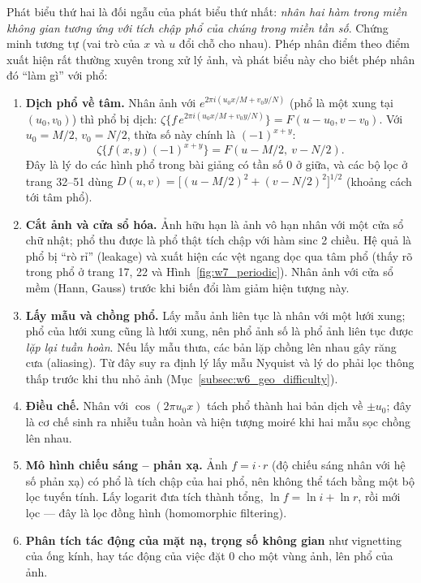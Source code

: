 Phát biểu thứ hai là đối ngẫu của phát biểu thứ nhất: \emph{nhân hai hàm trong miền không gian tương ứng với tích chập phổ của chúng trong miền tần số}. Chứng minh tương tự (vai trò của $x$ và $u$ đổi chỗ cho nhau). Phép nhân điểm theo điểm xuất hiện rất thường xuyên trong xử lý ảnh, và phát biểu này cho biết phép nhân đó ``làm gì'' với phổ:

\begin{enumerate}
    \item \textbf{Dịch phổ về tâm.} Nhân ảnh với $e^{2\pi i(u_0 x/M + v_0 y/N)}$ (phổ là một xung tại $(u_0, v_0)$) thì phổ bị dịch: $\zeta\{f\,e^{2\pi i(u_0 x/M + v_0 y/N)}\} = F(u - u_0, v - v_0)$. Với $u_0 = M/2$, $v_0 = N/2$, thừa số này chính là $(-1)^{x + y}$:
    \begin{equation}
    \zeta\{f(x, y)(-1)^{x + y}\} = F(u - M/2,\ v - N/2).
    \end{equation}
    Đây là lý do các hình phổ trong bài giảng có tần số $0$ ở giữa, và các bộ lọc ở trang 32--51 dùng $D(u, v) = \big[(u - M/2)^2 + (v - N/2)^2\big]^{1/2}$ (khoảng cách tới tâm phổ).
    \item \textbf{Cắt ảnh và cửa sổ hóa.} Ảnh hữu hạn là ảnh vô hạn nhân với một cửa sổ chữ nhật; phổ thu được là phổ thật tích chập với hàm sinc 2 chiều. Hệ quả là phổ bị ``rò rỉ'' (leakage) và xuất hiện các vệt ngang dọc qua tâm phổ (thấy rõ trong phổ ở trang 17, 22 và Hình~\ref{fig:w7_periodic}). Nhân ảnh với cửa sổ mềm (Hann, Gauss) trước khi biến đổi làm giảm hiện tượng này.
    \item \textbf{Lấy mẫu và chồng phổ.} Lấy mẫu ảnh liên tục là nhân với một lưới xung; phổ của lưới xung cũng là lưới xung, nên phổ ảnh số là phổ ảnh liên tục được \emph{lặp lại tuần hoàn}. Nếu lấy mẫu thưa, các bản lặp chồng lên nhau gây răng cưa (aliasing). Từ đây suy ra định lý lấy mẫu Nyquist và lý do phải lọc thông thấp trước khi thu nhỏ ảnh (Mục~\ref{subsec:w6_geo_difficulty}).
    \item \textbf{Điều chế.} Nhân với $\cos(2\pi u_0 x)$ tách phổ thành hai bản dịch về $\pm u_0$; đây là cơ chế sinh ra nhiễu tuần hoàn và hiện tượng moiré khi hai mẫu sọc chồng lên nhau.
    \item \textbf{Mô hình chiếu sáng -- phản xạ.} Ảnh $f = i \cdot r$ (độ chiếu sáng nhân với hệ số phản xạ) có phổ là tích chập của hai phổ, nên không thể tách bằng một bộ lọc tuyến tính. Lấy logarit đưa tích thành tổng, $\ln f = \ln i + \ln r$, rồi mới lọc — đây là lọc đồng hình (homomorphic filtering).
    \item \textbf{Phân tích tác động của mặt nạ, trọng số không gian} như vignetting của ống kính, hay tác động của việc đặt $0$ cho một vùng ảnh, lên phổ của ảnh.
\end{enumerate}

